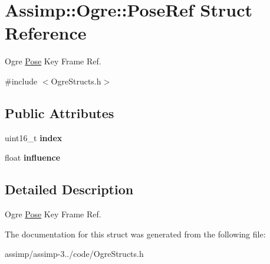 \hypertarget{struct_assimp_1_1_ogre_1_1_pose_ref}{\section{Assimp\+:\+:Ogre\+:\+:Pose\+Ref Struct Reference}
\label{struct_assimp_1_1_ogre_1_1_pose_ref}
}


Ogre \hyperlink{class_assimp_1_1_ogre_1_1_pose}{Pose} Key Frame Ref.  




{\ttfamily \#include $<$Ogre\+Structs.\+h$>$}

\subsection*{Public Attributes}
\begin{DoxyCompactItemize}
\item 
\hypertarget{struct_assimp_1_1_ogre_1_1_pose_ref_a318a7d4f5c11122e686b275e1098836a}{uint16\+\_\+t {\bfseries index}}\label{struct_assimp_1_1_ogre_1_1_pose_ref_a318a7d4f5c11122e686b275e1098836a}

\item 
\hypertarget{struct_assimp_1_1_ogre_1_1_pose_ref_a5f58780fcf2b57f2b363f0a7cdcffd37}{float {\bfseries influence}}\label{struct_assimp_1_1_ogre_1_1_pose_ref_a5f58780fcf2b57f2b363f0a7cdcffd37}

\end{DoxyCompactItemize}


\subsection{Detailed Description}
Ogre \hyperlink{class_assimp_1_1_ogre_1_1_pose}{Pose} Key Frame Ref. 

The documentation for this struct was generated from the following file\+:\begin{DoxyCompactItemize}
\item 
assimp/assimp-\/3../code/Ogre\+Structs.\+h\end{DoxyCompactItemize}
